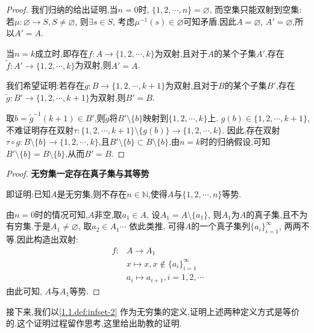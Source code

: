 \begin{proof}
    我们归纳的给出证明,当$n=0$时, $\{1,2,\cdots,n\}=\varnothing$, 而空集只能双射到空集:若$\mu:\varnothing \to S, S \neq \varnothing$, 则$\exists s \in S$, 考虑$\mu^{-1}(s) \in \varnothing$可知矛盾.因此$A=\varnothing$, $A'=\varnothing$,所以$A'=A$.

    当$n=k$成立时,即存在$f:A \to \{1,2,\cdots,k\}$为双射,且对于$A$的某个子集$A'$,存在$\tilde f:A' \to \{1,2,\cdots,k\}$为双射,则$A'=A$.

    我们希望证明:若存在$g:B \to \{1,2,\cdots,k+1\}$为双射,且对于$B$的某个子集$B'$,存在$\tilde g:B' \to \{1,2,\cdots,k+1\}$为双射,则$B'=B$.

    取$b = \tilde{g}^{-1}(k+1) \in B'$,则$\tilde g$将$B' \setminus \{b\}$映射到$\{1,2,\cdots,k\}$上. $g(b) \in \{ 1,2,\cdots,k+1\}$,不难证明存在双射$\tau:\{1,2,\cdots,k+1\} \setminus \{g(b)\} \to \{1,2,\cdots,k\}$.
    因此,存在双射$\tau \circ g : B \setminus \{ b \} \to \{1,2,\cdots,k\}$,且$B' \setminus \{b\} \subset B \setminus \{ b \}$,由$n=k$时的归纳假设,可知$B' \setminus \{b\} = B \setminus \{ b \}$,从而$B'=B$.
\end{proof}

\begin{proof}\label{1.1.proof:infset-equiv}
    \textbf{无穷集一定存在真子集与其等势}

    即证明:已知$A$是无穷集,则不存在$n \in \mathbb{N}$,使得$A$与$\{1,2,\cdots,n\}$等势.

    由$n=0$时的情况可知,$A$非空,取$a_1 \in A$, 设$A_1 = A \setminus \{a_1\}$, 则$A_1$为$A$的真子集,且不为有穷集.于是$A_1 \neq \varnothing$, 取$a_2 \in A_1 \cdots $ 依此类推, 可得$A$的一个真子集列$\{ a_i \}_{i=1}^{\infty}$, 两两不等.因此构造出双射:
    \begin{align*}
        f : & A \to A_1                                      \\
            & x \mapsto x, x \notin \{ a_i \}_{i=1}^{\infty} \\
            & a_i \mapsto a_{i+1}, i=1,2,\cdots
    \end{align*}
    由此可知, $A$与$A_1$等势.
\end{proof}

接下来,我们以\autoref{1.1.def:infset-2} 作为无穷集的定义,证明上述两种定义方式是等价的.这个证明过程留作思考,这里给出助教的证明.

